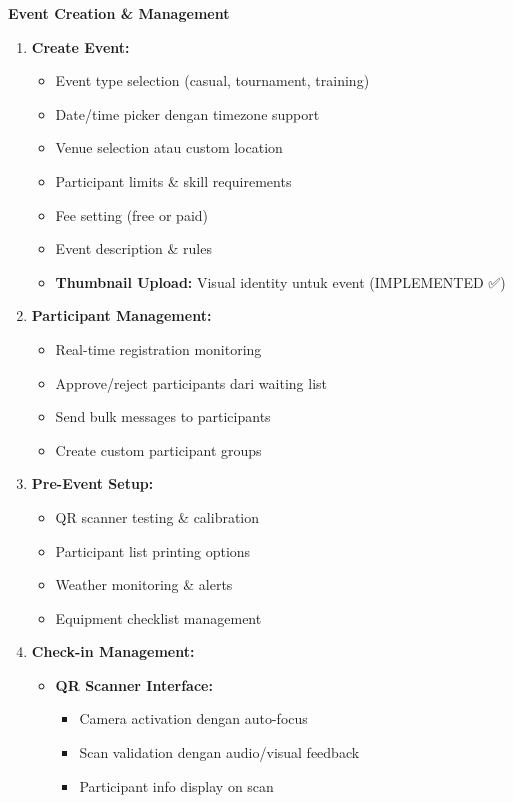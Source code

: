 \documentclass[12pt,a4paper]{article}
\begin{document}
\begin{implemented}
\textbf{Event Creation \& Management}
\begin{enumerate}
    \item \textbf{Create Event:}
    \begin{itemize}
        \item Event type selection (casual, tournament, training)
        \item Date/time picker dengan timezone support
        \item Venue selection atau custom location
        \item Participant limits \& skill requirements
        \item Fee setting (free or paid)
        \item Event description \& rules
        \item \textbf{Thumbnail Upload:} Visual identity untuk event (IMPLEMENTED ✅)
    \end{itemize}
    \item \textbf{Participant Management:}
    \begin{itemize}
        \item Real-time registration monitoring
        \item Approve/reject participants dari waiting list
        \item Send bulk messages to participants
        \item Create custom participant groups
    \end{itemize}
    \item \textbf{Pre-Event Setup:}
    \begin{itemize}
        \item QR scanner testing \& calibration
        \item Participant list printing options
        \item Weather monitoring \& alerts
        \item Equipment checklist management
    \end{itemize}
    \item \textbf{Check-in Management:}
    \begin{itemize}
        \item \textbf{QR Scanner Interface:}
        \begin{itemize}
            \item Camera activation dengan auto-focus
            \item Scan validation dengan audio/visual feedback
            \item Participant info display on scan

\end{itemize}
\end{itemize}
\end{enumerate}
\end{implemented}
\end{document}
